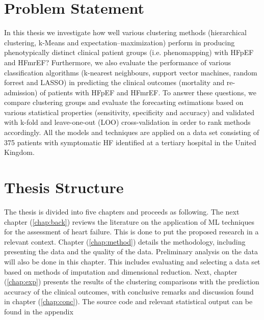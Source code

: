 \documentclass[../thesis.tex]{subfiles}
\begin{document}
\section{Problem Statement}
\label{sec:prob_stat}

\noindent In this thesis we investigate how well various clustering methods (hierarchical clustering, k-Means and expectation–maximization) perform in producing phenotypically distinct clinical patient groups (i.e. phenomapping) with HFpEF and HFmrEF? Furthermore, we also evaluate the performance of various classification algorithms (k-nearest neighbours, support vector machines, random forrest and LASSO) in predicting the clinical outcomes (mortality and re-admission) of patients with HFpEF and HFmrEF. To answer these questions, we compare clustering groups and evaluate the forecasting estimations based on various statistical properties (sensitivity, specificity and accuracy) and validated with k-fold and leave-one-out (LOO) cross-validation in order to rank methods accordingly. All the models and techniques are applied on a data set consisting of 375 patients with symptomatic HF identified at a tertiary hospital in the United Kingdom.  

\section{Thesis Structure}
\label{sec:thesis_struc}

\noindent The thesis is divided into five chapters and proceeds as following. The next chapter (\ref{chap:back}) reviews the literature on the application of ML techniques for the assessment of heart failure. This is done to put the proposed research in a relevant context. Chapter (\ref{chap:method}) details the methodology, including presenting the data and the quality of the data. Preliminary analysis on the data will also be done in this chapter. This includes evaluating and selecting a data set based on methods of imputation and dimensional reduction. Next, chapter (\ref{chap:exp}) presents the results of the clustering comparisons with the prediction accuracy of the clinical outcomes, with conclusive remarks and discussion found in chapter (\ref{chap:conc}). The source code and relevant statistical output can be found in the appendix  
\end{document}
